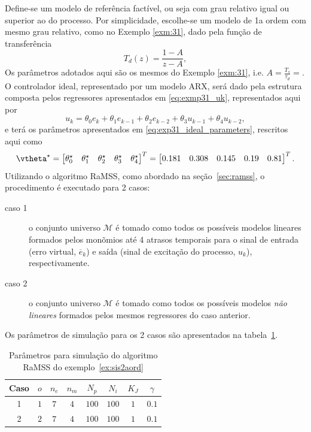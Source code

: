 \begin{exmp}
  Define-se um modelo de referência factível, ou seja com grau relativo igual ou superior ao do processo. Por simplicidade, escolhe-se um modelo de 1a ordem com mesmo grau relativo, como no Exemplo \ref{exm:31}, dado pela função de transferência
  \begin{equation}
    T_d(z) = \frac{1-A}{z-A},
    \label{eq:mr_sis2aord}
  \end{equation}
  Os parâmetros adotados aqui são os mesmos do Exemplo \ref{exm:31}, i.e. $A= \frac{T_s}{\tau_d}=$.
  O controlador ideal, representado por um modelo ARX, será dado pela estrutura composta pelos regressores apresentados em \eqref{eq:exmp31_uk}, representados aqui por
  \begin{equation}
    \label{eq:exp51_contIdeal}
    u_k = \theta_0e_{k} + \theta_1e_{k-1} + \theta_2e_{k-2} + \theta_3u_{k-1} + \theta_4u_{k-2},
  \end{equation}
  e terá os parâmetros apresentados em \eqref{eq:exp31_ideal_parameters}, rescritos aqui como
  \begin{equation}
    \vtheta^\star= \begin{bmatrix} \theta^\star_0 & \theta^\star_1 & \theta^\star_2 & \theta^\star_3 & \theta^\star_4 \end{bmatrix}^T =  \begin{bmatrix} 0.181 & 0.308 &  0.145 &  0.19 & 0.81 \end{bmatrix}^T.
  \label{eq:ex51_ideal_parameters}
\end{equation}
Utilizando o algoritmo RaMSS, como abordado na seção~\ref{sec:ramss}, o procedimento é executado para 2 casos:
\begin{description}
  \item[caso 1] o conjunto universo $\mathscr{M}$ é tomado como todos os possíveis modelos lineares formados pelos monõmios até 4 atrasos temporais para o sinal de entrada (erro virtual, $\overline{e}_k$) e saída (sinal de excitação do processo, $u_k$), respectivamente.
  \item[caso 2] o conjunto universo $\mathscr{M}$ é tomado como todos os possíveis modelos \textit{não lineares} formados pelos mesmos regressores do caso anterior. 
\end{description}
Os parâmetros de simulação para os 2 casos são apresentados na tabela~\ref{tab:exp51_param}. 

\begin{table}[htpb]
  \centering
  \caption{Parâmetros para simulação do algoritmo RaMSS do exemplo~\ref{ex:sis2aord} }\label{tab:exp51_param}
  \begin{tabular}{c|c|c|c|c|c|c|c}
    Caso & $o$ & $n_e$ & $n_m$ & $N_p$ & $N_i$ & $K_J$ & $\gamma$ \\
    \hline
    1 & $ 1 $ & $7$ & $4$ & $100$ & $100$ & $1$ & $0.1$ \\
    2 & $ 2 $ & $7$ & $4$ & $100$ & $100$ & $1$ & $0.1$
  \end{tabular}
\end{table}


\end{exmp}
